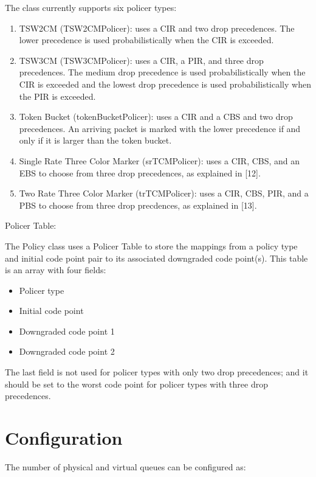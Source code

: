 The  class currently supports six policer types:
\begin{enumerate}
\item
TSW2CM (TSW2CMPolicer): uses a CIR and two drop precedences.  The lower precedence is used probabilistically when the CIR is exceeded.
\item
TSW3CM (TSW3CMPolicer): uses a CIR, a PIR, and three drop precedences.  The medium drop precedence is used probabilistically when the CIR is exceeded and the lowest drop precedence is used probabilistically when the PIR is exceeded.
\item
Token Bucket (tokenBucketPolicer): uses a CIR and a CBS and two drop precedences.  An arriving packet is marked with the lower precedence if and only if it is larger than the token bucket.
\item
Single Rate Three Color Marker (srTCMPolicer): uses a CIR, CBS, and an EBS to choose from three drop precedences, as explained in [12].
\item
Two Rate Three Color Marker (trTCMPolicer): uses a CIR, CBS, PIR, and a PBS to choose from three drop precdences, as explained in [13].

\end{enumerate}

Policer Table:

The Policy class uses a Policer Table to store the mappings from a policy type and initial code point pair to its associated downgraded code point(s).  This table is an array with four fields:
\begin{itemize}
\item
Policer type
\item
Initial code point
\item
Downgraded code point 1
\item
Downgraded code point 2
\end{itemize}
The last field is not used for policer types with only two drop precedences; and it should be set to the worst code point for policer types with three drop precedences.

\section{Configuration}
\label{sec:diffservconfig}

The number of physical and virtual queues can be configured as:


